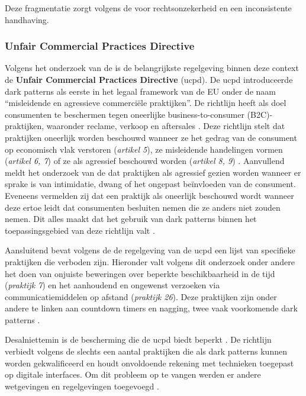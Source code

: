 Deze fragmentatie zorgt volgens de \textcite{EPRS2025} voor rechtsonzekerheid en een inconsistente handhaving. 

\vspace{1em}

\subsubsection{Unfair Commercial Practices Directive}
Volgens het onderzoek van de \textcite{Commissie2022} is de belangrijkste regelgeving binnen deze context de \textbf{Unfair Commercial Practices Directive} (\acrshort{ucpd}). De \acrshort{ucpd} introduceerde dark patterns als eerste in het legaal framework van de EU onder de naam ``misleidende en agressieve commerciële praktijken''. De richtlijn heeft als doel consumenten te beschermen tegen oneerlijke business-to-consumer (B2C)-praktijken, waaronder reclame, verkoop en aftersales \autocite{EPRS2025}. Deze richtlijn stelt dat praktijken oneerlijk worden beschouwd wanneer ze het gedrag van de consument op economisch vlak verstoren (\textit{artikel 5}), ze misleidende handelingen vormen (\textit{artikel 6, 7}) of ze als agressief beschouwd worden (\textit{artikel 8, 9}) \autocite{OECD2022}. Aanvullend meldt het onderzoek van de \textcite{Commissie2022} dat praktijken als agressief gezien worden wanneer er sprake is van intimidatie, dwang of het ongepast beïnvloeden van de consument. Eveneens vermelden zij dat een praktijk als oneerlijk beschouwd wordt wanneer deze ertoe leidt dat consumenten besluiten nemen die ze anders niet zouden nemen. Dit alles maakt dat het gebruik van dark patterns binnen het toepassingsgebied van deze richtlijn valt \autocite{Commissie2022}. 

\vspace{0.5em}

Aansluitend bevat volgens de \textcite{OECD2022} de regelgeving van de \acrshort{ucpd} een lijst van specifieke praktijken die verboden zijn. Hieronder valt volgens dit onderzoek onder andere het doen van onjuiste beweringen over beperkte beschikbaarheid in de tijd (\textit{praktijk 7}) en het aanhoudend en ongewenst verzoeken via communicatiemiddelen op afstand (\textit{praktijk 26}). Deze praktijken zijn onder andere te linken aan countdown timers en nagging, twee vaak voorkomende dark patterns \autocite{OECD2022}.

\vspace{0.5em}

Desalniettemin is de bescherming die de \acrshort{ucpd} biedt beperkt \autocite{EPRS2025}. De richtlijn verbiedt volgens de \textcite{EPRS2025} slechts een aantal praktijken die als dark patterns kunnen worden gekwalificeerd en houdt onvoldoende rekening met technieken toegepast op digitale interfaces. Om dit probleem op te vangen werden er andere wetgevingen en regelgevingen toegevoegd \autocite{EPRS2025}.

